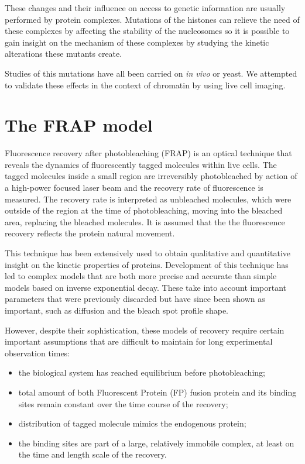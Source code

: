These changes and their influence on access to genetic information are usually performed
by protein complexes. Mutations of the histones can relieve the need of these complexes
by affecting the stability of the nucleosomes so it is possible to gain insight on
the mechanism of these complexes by studying the kinetic alterations these mutants create.

Studies of this mutations have all been carried on \textit{in vivo} or yeast. We attempted
to validate these effects in the context of chromatin by using live cell imaging.

\section{The FRAP model}

  Fluorescence recovery after photobleaching (FRAP) is an optical technique
  that reveals the dynamics of fluorescently tagged molecules within live cells.
  The tagged molecules inside a small region are irreversibly photobleached by
  action of a high-power focused laser beam and the recovery rate of fluorescence
  is measured. The recovery rate is interpreted as unbleached molecules,
  which were outside of the region at the time of photobleaching, moving into
  the bleached area, replacing the bleached molecules. It is assumed that the
  the fluorescence recovery reflects the protein natural movement.

  This technique has been extensively used to obtain qualitative and quantitative
  insight on the kinetic properties of proteins. Development of this technique has
  led to complex models that are both more precise and accurate than simple models
  based on inverse exponential decay. These take into account important parameters
  that were previously discarded but have since been shown as important, such
  as diffusion and the bleach spot profile shape.

  However, despite their sophistication, these models of recovery require certain important
  assumptions that are difficult to maintain for long experimental observation times:

  \begin{itemize}
    \item the biological system has reached equilibrium before photobleaching;
    \item total amount of both Fluorescent Protein (FP) fusion protein and its
          binding sites remain constant over the time course of the recovery;
    \item distribution of tagged molecule mimics the endogenous protein;
    \item the binding sites are part of a large, relatively immobile complex, at
          least on the time and length scale of the recovery.
  \end{itemize}

